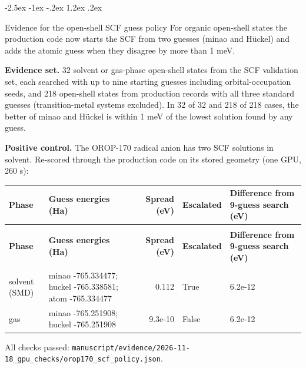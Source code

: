 \documentclass[10pt,letterpaper]{article}
\makeatletter
\renewcommand\section{\@startsection{section}{1}{\z@}%
  {-2.5ex \@plus -1ex \@minus -.2ex}%
  {1.2ex \@plus .2ex}%
  {\normalfont\large\bfseries\raggedright}}
\makeatother
\begin{document}
\section{Evidence for the open-shell SCF guess policy}
For organic open-shell states the production code now starts the SCF from two guesses (minao and Hückel) and adds the atomic guess when they disagree by more than 1 meV.

\textbf{Evidence set.} 32 solvent or gas-phase open-shell states from the SCF validation set, each searched with up to nine starting guesses including orbital-occupation seeds, and 218 open-shell states from production records with all three standard guesses (transition-metal systems excluded). In 32 of 32 and 218 of 218 cases, the better of minao and Hückel is within 1 meV of the lowest solution found by any guess.

\textbf{Positive control.} The OROP-170 radical anion has two SCF solutions in solvent. Re-scored through the production code on its stored geometry (one GPU, 260 s):

{
\footnotesize
\setlength{\tabcolsep}{5pt}
\renewcommand{\arraystretch}{1.12}
\setlength{\LTleft}{0pt}\setlength{\LTright}{0pt}
\begin{xltabular}{\linewidth}{@{}>{\raggedright\arraybackslash}X>{\raggedright\arraybackslash}Xrl>{\raggedleft\arraybackslash}p{2.45cm}@{}}
\toprule
\textbf{Phase} & \textbf{Guess energies (Ha)} & \textbf{Spread (eV)} & \textbf{Escalated} & \textbf{Difference from 9-\allowbreak{}guess search (eV)} \\
\midrule
\endfirsthead
{} \\
\toprule
\textbf{Phase} & \textbf{Guess energies (Ha)} & \textbf{Spread (eV)} & \textbf{Escalated} & \textbf{Difference from 9-\allowbreak{}guess search (eV)} \\
\midrule
\endhead
\midrule
{} \\
\endfoot
\bottomrule
\endlastfoot
solvent (SMD) & minao -765.334477; huckel -765.338581; atom -765.334477 & 0.112 & True & 6.2e-\allowbreak{}12 \\
gas & minao -765.251908; huckel -765.251908 & 9.3e-\allowbreak{}10 & False & 6.2e-\allowbreak{}12 \\
\end{xltabular}
}
All checks passed: \texttt{manuscript/\allowbreak{}evidence/\allowbreak{}2026-\allowbreak{}11-\allowbreak{}18\_\allowbreak{}gpu\_\allowbreak{}checks/\allowbreak{}orop170\_\allowbreak{}scf\_\allowbreak{}policy.\allowbreak{}json}.
\end{document}
